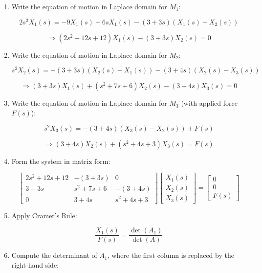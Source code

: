 \documentclass[11pt]{article}
\begin{document}
\begin{enumerate}[label=(\alph*), itemindent=*, leftmargin=*, nolistsep]

    \item Write the equation of motion in Laplace domain for $M_1$:

    \[
    2s^2 X_1(s) = -9 X_1(s) - 6s X_1(s) - (3 + 3s)(X_1(s) - X_2(s))
    \]

    \[
    \Rightarrow (2s^2 + 12s + 12)X_1(s) - (3 + 3s)X_2(s) = 0
    \]

    \item Write the equation of motion in Laplace domain for $M_2$:

    \[
    s^2 X_2(s) = - (3 + 3s)(X_2(s) - X_1(s)) - (3 + 4s)(X_2(s) - X_3(s))
    \]

    \[
    \Rightarrow (3 + 3s)X_1(s) + (s^2 + 7s + 6)X_2(s) - (3 + 4s)X_3(s) = 0
    \]

    \item Write the equation of motion in Laplace domain for $M_3$ (with applied force $F(s)$):

    \[
    s^2 X_3(s) = - (3 + 4s)(X_3(s) - X_2(s)) + F(s)
    \]

    \[
    \Rightarrow (3 + 4s)X_2(s) + (s^2 + 4s + 3)X_3(s) = F(s)
    \]

    \item Form the system in matrix form:

    \[
    \begin{bmatrix}
    2s^2 + 12s + 12 & -(3 + 3s) & 0 \\
    3 + 3s & s^2 + 7s + 6 & -(3 + 4s) \\
    0 & 3 + 4s & s^2 + 4s + 3
    \end{bmatrix}
    \begin{bmatrix}
    X_1(s) \\ X_2(s) \\ X_3(s)
    \end{bmatrix}
    =
    \begin{bmatrix}
    0 \\ 0 \\ F(s)
    \end{bmatrix}
    \]

    \item Apply Cramer's Rule:

    \[
    \frac{X_1(s)}{F(s)} = \frac{\det(A_1)}{\det(A)}
    \]

    \item Compute the determinant of \( A_1 \), where the first column is replaced by the right-hand side:


\end{enumerate}
\end{document}
